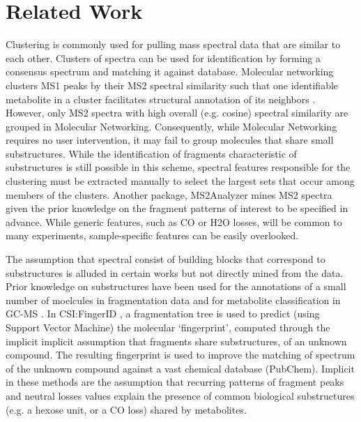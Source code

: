 \section{Related Work}

Clustering is commonly used for pulling mass spectral data that are similar to each other. Clusters of spectra can be used for identification by forming a consensus spectrum and matching it against database. Molecular networking clusters MS1 peaks by their MS2 spectral similarity such that one identifiable metabolite in a cluster facilitates structural annotation of its neighbors \cite{yang2013molecular, nguyen2013ms, van2016urinary}.  However, only MS2 spectra with high overall (e.g. cosine) spectral similarity are grouped in Molecular Networking. Consequently, while Molecular Networking requires no user intervention, it may fail to group molecules that share small substructures. While the identification of fragments characteristic of substructures is still possible in this scheme, spectral features responsible for the clustering must be extracted manually to select the largest sets that occur among members of the clusters. Another package, MS2Analyzer \cite{ma2014ms2analyzer} mines MS2 spectra given the prior knowledge on the fragment patterns of interest to be specified in advance. While generic features, such as CO or H2O losses, will be common to many experiments, sample-specific features can be easily overlooked. 

The assumption that spectral consist of building blocks that correspond to substructures is alluded in certain works but not directly mined from the data. Prior knowledge on substructures have been used for the annotations of a small number of moelcules in fragmentation data \cite{Sweeney2014} and for metabolite classification in GC-MS \cite{Scott1994, Hummel2010}. In CSI:FingerID \cite{Duhrkop2015}, a fragmentation tree is used to predict (using Support Vector Machine) the molecular `fingerprint', computed through the implicit implicit assumption that fragments share substructures, of an unknown compound. The resulting fingerprint is used to improve the matching of spectrum of the unknown compound against a vast chemical database (PubChem). Implicit in these methods are the assumption that recurring patterns of fragment peaks and neutral losses values explain the presence of common biological substructures (e.g. a hexose unit, or a CO loss) shared by metabolites. 

